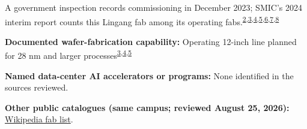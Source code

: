 \begin{minipage}[t][0.90\textheight][t]{\textwidth}
\begin{minipage}[t]{\textwidth}
\begin{minipage}[t]{0.32\textwidth}
\medskip
{\footnotesize A government inspection records commissioning in December 2023; SMIC's 2024 interim report counts this Lingang fab among its operating fabs.\nobreak\textsuperscript{\href{\detokenize{https://www1.hkexnews.hk/listedco/listconews/sehk/2026/0408/2026040801181.pdf}}{\textcolor{accent}{2}},\href{\detokenize{https://www.smics.com/uploads/e00981-2.pdf}}{\textcolor{accent}{3}},\href{\detokenize{https://www.shanghai.gov.cn/cmsres/6d/6df100454e5b422c9d63debfb083e207/527c28010761042fca1e1399a563b159.pdf}}{\textcolor{accent}{4}},\href{\detokenize{https://www.hkexnews.hk/listedco/listconews/sehk/2024/0909/2024090900336.pdf}}{\textcolor{accent}{5}},\href{\detokenize{https://www1.hkexnews.hk/listedco/listconews/sehk/2026/0326/2026032601632.pdf}}{\textcolor{accent}{6}},\href{\detokenize{https://sthj.sh.gov.cn/cmsres/34/34b6bc53323247249b6626a63bd9bd43/b0659a953a0f413aa1c8846fd40f53ea.pdf}}{\textcolor{accent}{7}},\href{\detokenize{https://www.lingang.gov.cn/html/website/lg/index/government/gonggaogongshi/guihuagongshi/1883346289701220354.html}}{\textcolor{accent}{8}}}\par}
\medskip
{\footnotesize\textbf{Documented wafer-fabrication capability:} Operating 12-inch line planned for 28 nm and larger processes\nobreak\textsuperscript{\href{\detokenize{https://www.smics.com/uploads/e00981-2.pdf}}{\textcolor{accent}{3}},\href{\detokenize{https://www.shanghai.gov.cn/cmsres/6d/6df100454e5b422c9d63debfb083e207/527c28010761042fca1e1399a563b159.pdf}}{\textcolor{accent}{4}},\href{\detokenize{https://www.hkexnews.hk/listedco/listconews/sehk/2024/0909/2024090900336.pdf}}{\textcolor{accent}{5}}}\par}
\end{minipage}
\end{minipage}
\par\vspace{0.65em}
\medskip
{\footnotesize\textbf{Named data-center AI accelerators or programs:} None identified in the sources reviewed.\par}
\smallskip
{\sffamily\scriptsize\color{black!62}\textbf{Other public catalogues (same campus; reviewed August 25, 2026):} \href{\detokenize{https://en.wikipedia.org/w/index.php?title=List_of_semiconductor_fabrication_plants&oldid=1370451124}\#\detokenize{Open_plants}}{Wikipedia fab list}.\par}
\medskip

\end{minipage}
